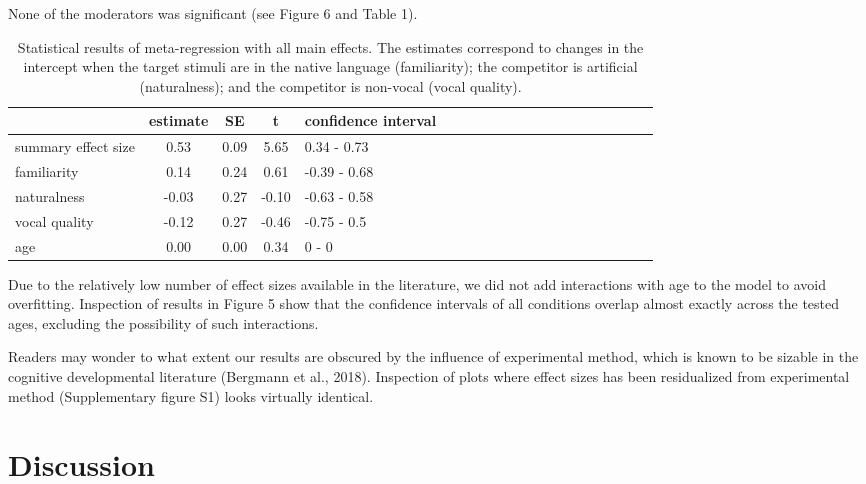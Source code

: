 \documentclass[man]{apa6}
\begin{document}
None of the moderators was significant (see Figure 6 and Table 1).

\begin{table}[tbp]
\begin{center}
\begin{threeparttable}
\caption{\label{tab:Table1}Statistical results of meta-regression with all main effects. The estimates correspond to changes in the intercept when the target stimuli are in the native language (familiarity); the competitor is artificial (naturalness); and the competitor is non-vocal (vocal quality).}
\begin{tabular}{lccclccclccclccclccc}
\toprule
 & estimate & SE & t & confidence interval\\
\midrule
summary effect size & 0.53 & 0.09 & 5.65 & 0.34 - 0.73\\
familiarity & 0.14 & 0.24 & 0.61 & -0.39 - 0.68\\
naturalness & -0.03 & 0.27 & -0.10 & -0.63 - 0.58\\
vocal quality & -0.12 & 0.27 & -0.46 & -0.75 - 0.5\\
age & 0.00 & 0.00 & 0.34 & 0 - 0\\
\bottomrule
\end{tabular}
\end{threeparttable}
\end{center}
\end{table}

Due to the relatively low number of effect sizes available in the
literature, we did not add interactions with age to the model to avoid
overfitting. Inspection of results in Figure 5 show that the confidence
intervals of all conditions overlap almost exactly across the tested
ages, excluding the possibility of such interactions.

Readers may wonder to what extent our results are obscured by the
influence of experimental method, which is known to be sizable in the
cognitive developmental literature (Bergmann et al., 2018). Inspection
of plots where effect sizes has been residualized from experimental
method (Supplementary figure S1) looks virtually identical.

\section{Discussion}\label{discussion}
\end{document}
